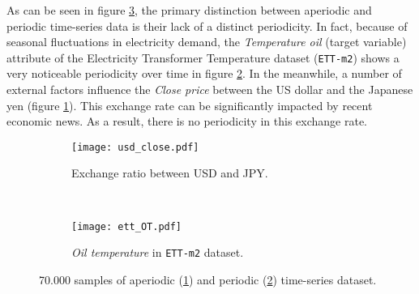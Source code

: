 
As can be seen in figure \ref{fig:ill_aperiodic}, the primary distinction between aperiodic and periodic time-series data is their lack of a distinct periodicity. In fact, because of seasonal fluctuations in electricity demand, the \textit{Temperature oil} (target variable) attribute of the Electricity Transformer Temperature dataset (\verb|ETT-m2|) \cite{zhou2021informer} shows a very noticeable periodicity over time in figure \ref{fig:periodic}. In the meanwhile, a number of external factors influence the \textit{Close price} between the US dollar and the Japanese yen (figure \ref{fig:aperiodic}). This exchange rate can be significantly impacted by recent economic news. As a result, there is no periodicity in this exchange rate.

\begin{figure}[H]
    \centering
    \begin{subfigure}[b]{0.5\textwidth}
        \centering
        \texttt{[image: usd\_close.pdf]}
        \caption{Exchange ratio between USD and JPY.}
        \label{fig:aperiodic}
    \end{subfigure}%
    ~
    \begin{subfigure}[b]{0.5\textwidth}
        \centering
        \texttt{[image: ett\_OT.pdf]}
        \cprotect\caption{\textit{Oil temperature} in \verb|ETT-m2| dataset.}
        \label{fig:periodic}
    \end{subfigure}

    \caption{70.000 samples of aperiodic (\ref{fig:aperiodic}) and periodic (\ref{fig:periodic}) time-series dataset.}
    \label{fig:ill_aperiodic}
\end{figure}


